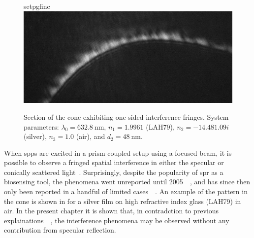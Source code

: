\begin{figure}[ht]
 \centering
 {setpgfinc}
 \includegraphics[keepaspectratio,width=15.5cm]{interference/figures/coneintro.png}
 \caption{Section of the cone exhibiting one-sided interference fringes.
 System parameters: $\lambda_0 = \SI{632.8}{\nano\meter}$,
 $n_1=1.9961$ (LAH79), $n_2 = \num{-14.48+1.09i}$ (silver), $n_3=1.0$
 (air), and $d_2=\SI{48}{\nano\meter}$.}
\label{fig:coneintrofig}
\end{figure}
When \glspl{spp} are excited in a prism-coupled setup using a focused beam, it is
possible to observe a fringed spatial interference in either the
specular or conically scattered light~\cite{webster2013interference}.
Surprisingly, despite the popularity of \gls{spr} as a biosensing tool, the
phenomena went unreported until
2005~\cite{schumann2008near}~\cite{andaloro2005optical}, and has since then
only been reported in a handful of limited
cases~\cite{shan2009measuring}~\cite{simon2007observation}.  An example of the
pattern in the cone is shown in  for a silver film on
high refractive index glass (LAH79) in air.  In the present chapter it is
shown that, in contradction to previous
explainations~\cite{schumann2008near}~\cite{andaloro2005optical}, the
interference phenomena may be observed without any contribution from specular
reflection.

